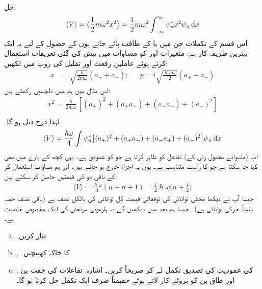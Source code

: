 حل:
\begin{align*}
\langle V  \rangle =\big\langle\frac{1}{2}m\omega ^{2}x^{2}\big\rangle=\frac{1}{2}m\omega ^{2}\int_{-\infty}^{\infty}\psi_{n}^{*}x^{2}\psi_{n}\dif{x}
\end{align*}
اس قسم کے تکملات جن میں  یا  کے طاقت پائے جاتے ہوں کے حصول کے لیے یہ ایک بہترین طریقہ کار ہے: متغیرات  اور  کو مساوات  میں پیش کی گئی تعریفات استعمال کرتے ہوئے  عاملین رفعت اور تقلیل کی روپ میں لکھیں:
\begin{align}
x&=\sqrt{\frac{\hslash}{2m\omega}}(a_++a_-); && p=i\sqrt{\frac{\hslash m \omega}{2}}(a_+-a_-)
\end{align}
اس مثال میں ہم  میں دلچسپی رکھتے ہیں:
\begin{align*}
x^{2}=\frac{\hslash}{2m\omega}[(a_{+})^{2}+(a_{+}a_{-})+(a_{-}a_{+})+(a_{-})^{2}] \\
\end{align*}
لہٰذا درج ذیل ہو گا۔
\begin{align*}
\langle V \rangle =\frac{\hslash\omega}{4}\int \psi_{n}^{*}\big[(a_{+})^{2}+(a_{+}a_{-})+(a_{-}a_{+})+(a_{-})^{2}\big ]\psi_{n}\dif{x}
\end{align*}
اب (ماسوائے معمول زنی کے)  تفاعل  کو ظاہر کرتا ہے  جو  کو عمودی ہے۔ یہی کچھ  کے بارے میں بھی کہا جا سکتا ہے جو  کا راست متناسب ہے۔ یوں یہ اجزاء خارج ہو جاتے ہیں، اور ہم مساوات   استعمال کر کے باقی دو کی قیمتیں حاصل کر سکتے ہیں:
\begin{align*}
\langle V \rangle =\frac{\hslash\omega}{4}(n+n+1)=\frac{1}{2}\hslash\omega\big (n+\frac{1}{2} \big )
\end{align*}
جیسا آپ نے دیکھا مخفی توانائی کی توقعاتی قیمت کل توانائی کی بالکل نصف ہے (باقی نصف حصہ یقیناً حرکی توانائی ہے)۔ جیسا ہم بعد میں دیکھیں گے یہ ہارمونی مرتعش کی ایک مخصوص خاصیت  ہے۔
\begin{enumerate}[a.]
\item
{} تیار کریں۔
\item
{}, کا خاکہ  کھینچیں۔
\item
{}, کی عمودیت کی تصدیق  تکمل لے کر صریحاً کریں۔ اشارہ:  تفاعلات کی جفت پن اور طاق پن کو بروئے کار لاتے ہوئے حقیقتاً صرف ایک تکمل حل کرنا ہو گا۔
\end{enumerate}
